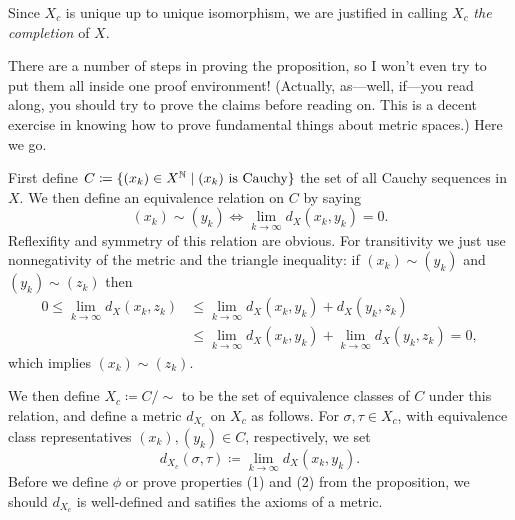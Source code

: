 \begin{definition}
  Since $X_c$ is unique up to unique isomorphism, we are justified in
  calling $X_c$ \textit{the completion} of $X$.
\end{definition}

There are a number of steps in proving the proposition, so I won't
even try to put them all inside one proof environment! (Actually,
as---well, if---you read along, you should try to prove the claims
before reading on. This is a decent exercise in knowing how to prove
fundamental things about metric spaces.) Here we go.


\begin{nothing}[Construction]
  First define $C \coloneqq \{(x_k) \in X^{\mathbb{N}} \mid (x_k)\text{ is
    Cauchy}\}$ the set of all Cauchy sequences in $X$. We then define
  an equivalence relation on $C$ by saying
  \[
  (x_k) \sim (y_k) \iff \lim_{k \to \infty} d_X(x_k,y_k) = 0.
  \]
  Reflexifity and symmetry of this relation are obvious. For
  transitivity we just use nonnegativity of the metric and the
  triangle inequality: if $(x_k) \sim (y_k)$ and $(y_k) \sim (z_k)$
  then
  \begin{align*}
    0 \le \lim_{k \to \infty} d_X(x_k,z_k) &\le \lim_{k \to \infty}
    d_X(x_k,y_k) + d_X(y_k,z_k) \\ &\le \lim_{k \to \infty} d_X(x_k,y_k) +
    \lim_{k \to \infty} d_X(y_k,z_k) = 0,
  \end{align*}
  which implies $(x_k) \sim (z_k)$.

  We then define $X_c \coloneqq C/{\sim}$ to be the set of equivalence
  classes of $C$ under this relation, and define a metric $d_{X_c}$ on
  $X_c$ as follows. For $\sigma, \tau \in X_c$, with equivalence class
  representatives $(x_k), (y_k) \in C$, respectively, we set
  \[
  d_{X_c}(\sigma, \tau) \coloneqq \lim_{k \to \infty} d_X(x_k, y_k).
  \]
  Before we define $\phi$ or prove properties (1) and (2) from the
  proposition, we should $d_{X_c}$ is well-defined and satifies the
  axioms of a metric.
\end{nothing}


